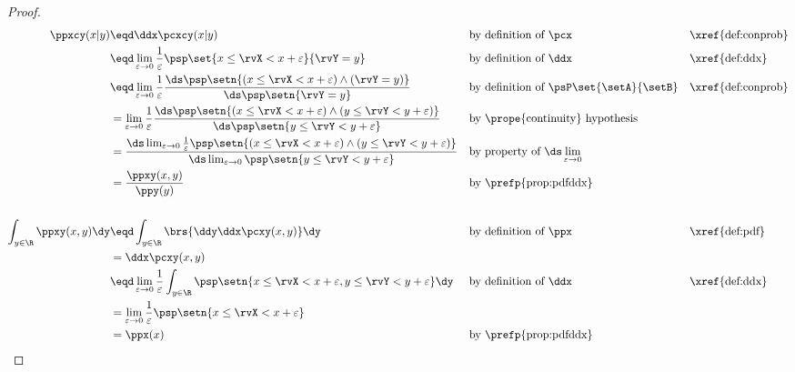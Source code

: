 \begin{proof}
\begin{align*}
  \ppxcy(x|y)
    &\eqd \ddx\pcxcy(x|y)
    && \text{by definition of $\pcx$}
    && \text{\xref{def:conprob}}
  \\&\eqd \lim_{\varepsilon\to0} \frac{1}{\varepsilon} \psp\set{x\le\rvX < x+\varepsilon}{\rvY=y}
    && \text{by definition of $\ddx$}
    && \text{\xref{def:ddx}}
  \\&\eqd \lim_{\varepsilon\to0}
          \frac{1}{\varepsilon}
          \frac{\ds\psp\setn{(x\le\rvX < x+\varepsilon) \land (\rvY=y)}}
               {\ds\psp\setn{\rvY=y}}
    && \text{by definition of $\psP\set{\setA}{\setB}$}
    && \text{\xref{def:conprob}}
  \\&= \lim_{\varepsilon\to0}
       \frac{1}{\varepsilon}
       \frac{\ds\psp\setn{(x\le\rvX < x+\varepsilon) \land (y\le\rvY<y+\varepsilon)}}
            {\ds\psp\setn{y\le\rvY<y+\varepsilon}}
    && \text{by \prope{continuity} hypothesis}
  \\&=  \frac{\ds\lim_{\varepsilon\to0} \frac{1}{\varepsilon}\psp\setn{(x\le\rvX < x+\varepsilon) \land (y\le\rvY<y+\varepsilon)}}
             {\ds\lim_{\varepsilon\to0}                      \psp\setn{y\le\rvY<y+\varepsilon}}
    && \text{by property of $\ds\lim_{\varepsilon\to0}$}
  \\&=    \frac{\ppxy(x,y)}{\ppy(y)}
    && \text{by \prefp{prop:pdfddx}}
\\
\\
  \int_{y\in\R}\ppxy(x,y)\dy
    &\eqd \int_{y\in\R} \brs{ \ddy\ddx\pcxy(x,y) } \dy
    && \text{by definition of $\ppx$}
    && \text{\xref{def:pdf}}
  \\&= \ddx\pcxy(x,y)
  \\&\eqd \lim_{\varepsilon\to0} \frac{1}{\varepsilon}
          \int_{y\in\R} \psp\setn{x\le\rvX<x+\varepsilon, y\le\rvY<y+\varepsilon} \dy
    && \text{by definition of $\ddx$}
    && \text{\xref{def:ddx}}
  \\&=    \lim_{\varepsilon\to0} \frac{1}{\varepsilon} \psp\setn{x\le\rvX<x+\varepsilon}
  \\&= \ppx(x)
    && \text{by \prefp{prop:pdfddx}}
\end{align*}
\end{proof}

